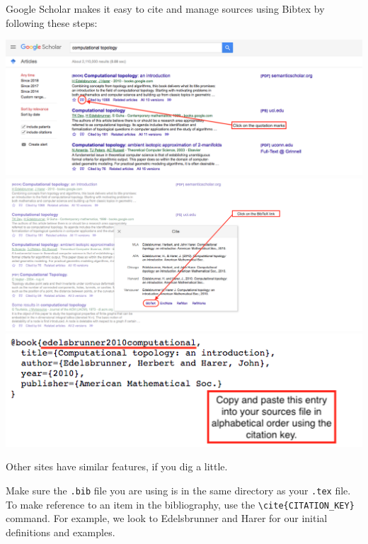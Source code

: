 \documentclass[12pt]{article}
\theoremstyle{definition}
\theoremstyle{theorem}
\begin{document}
Google Scholar makes it easy to cite and manage sources using Bibtex by following these steps:
\begin{center}
	\includegraphics[width=1\linewidth]{step1}\\
	\includegraphics[width=1\linewidth]{step2}\\
	\includegraphics[width=.5\linewidth]{step3}\\
\end{center}

Other sites have similar features, if you dig a little.

Make sure the \verb|.bib| file you are using is in the same directory as your \verb|.tex| file. To make reference to an item in the bibliography, use the \verb|\cite{CITATION_KEY}| command. For example, we look to Edelsbrunner and Harer \cite{edelsbrunner2010computational} for our initial definitions and examples.



\end{document}
